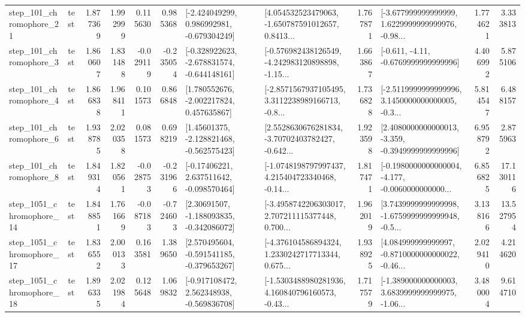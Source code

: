 \begin{tabular}{llrrrrllrlrr}
  step\_101\_chromophore\_21 &      test &      1.877369 &    1.992999 &      0.115630 &  0.985368 &   [-2.424049299, 0.986992981, -0.679304249] &  [4.054532523479063, -1.650787591012657, 0.8413... &       1.767871 &  [-3.677999999999999, 1.6229999999999976, -0.98... &            1.774621 &          3.333813 \\
   step\_101\_chromophore\_3 &      test &      1.860607 &    1.831488 &     -0.029119 & -0.235054 &  [-0.328922623, -2.678831574, -0.644148161] &  [-0.576982438126549, -4.242983120898898, -1.15... &       1.663867 &               [-0.611, -4.11, -0.6769999999999996] &            4.406992 &          5.875106 \\
   step\_101\_chromophore\_4 &      test &      1.866838 &    1.968411 &      0.101573 &  0.866848 &    [1.780552676, -2.002217824, 0.457635867] &  [-2.8571567937105495, 3.3112238989166713, -0.8... &       1.736828 &  [-2.5119999999999996, 3.1450000000000005, -0.3... &            5.814547 &          6.488157 \\
   step\_101\_chromophore\_6 &      test &      1.938785 &    2.020358 &      0.081573 &  0.698219 &    [1.45601375, -2.128821468, -0.562575423] &  [2.5528630676281834, -3.70702403782427, -0.642... &       1.923598 &  [2.4080000000000013, -3.359, -0.3949999999999996] &            6.958792 &          2.875963 \\
   step\_101\_chromophore\_8 &      test &      1.849314 &    1.820561 &     -0.028753 & -0.231966 &    [-0.17406221, 2.637511642, -0.098570464] &  [-1.0748198797997437, 4.215404723340468, -0.14... &       1.817471 &  [-0.1980000000000004, -4.177, -0.0060000000000... &            6.856825 &         17.130116 \\
 step\_1051\_chromophore\_14 &      test &      1.848851 &    1.761669 &     -0.087183 & -0.724603 &    [2.30691507, -1.188093835, -0.342086072] &  [-3.4958742206303017, 2.707211115377448, 0.700... &       1.962019 &  [3.7439999999999998, -1.6759999999999948, -0.5... &            3.138166 &         13.527954 \\
 step\_1051\_chromophore\_17 &      test &      1.836552 &    2.000133 &      0.163581 &  1.389650 &   [2.570495604, -0.591541185, -0.379653267] &  [-4.376104586894324, 1.2330242717713344, 0.675... &       1.938925 &  [4.084999999999997, -0.8710000000000022, -0.46... &            2.029410 &          4.214620 \\
 step\_1051\_chromophore\_18 &      test &      1.896335 &    2.021984 &      0.125648 &  1.069832 &   [-0.917108472, 2.562348938, -0.569836708] &  [-1.5303488980281936, 4.160840796160573, -0.43... &       1.717579 &  [-1.389000000000003, 3.6839999999999975, -1.06... &            3.480004 &          9.614710 \\

\end{tabular}
